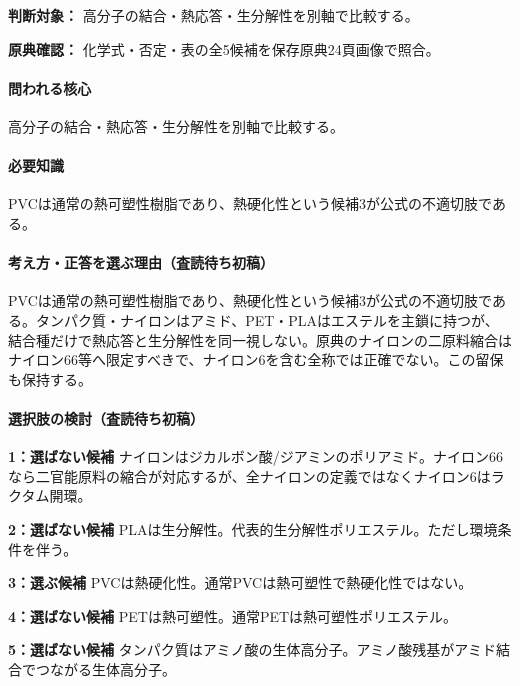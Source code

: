 \noindent\textbf{判断対象：} 高分子の結合・熱応答・生分解性を別軸で比較する。\par

\noindent\textbf{原典確認：} 化学式・否定・表の全5候補を保存原典24頁画像で照合。\par

\paragraph{問われる核心} 高分子の結合・熱応答・生分解性を別軸で比較する。

\paragraph{必要知識} PVCは通常の熱可塑性樹脂であり、熱硬化性という候補3が公式の不適切肢である。

\paragraph{考え方・正答を選ぶ理由（査読待ち初稿）} PVCは通常の熱可塑性樹脂であり、熱硬化性という候補3が公式の不適切肢である。タンパク質・ナイロンはアミド、PET・PLAはエステルを主鎖に持つが、結合種だけで熱応答と生分解性を同一視しない。原典のナイロンの二原料縮合はナイロン66等へ限定すべきで、ナイロン6を含む全称では正確でない。この留保も保持する。

\paragraph{選択肢の検討（査読待ち初稿）}\mbox{}\par

\noindent\textbf{1：選ばない候補} ナイロンはジカルボン酸/ジアミンのポリアミド。ナイロン66なら二官能原料の縮合が対応するが、全ナイロンの定義ではなくナイロン6はラクタム開環。\par

\noindent\textbf{2：選ばない候補} PLAは生分解性。代表的生分解性ポリエステル。ただし環境条件を伴う。\par

\noindent\textbf{3：選ぶ候補} PVCは熱硬化性。通常PVCは熱可塑性で熱硬化性ではない。\par

\noindent\textbf{4：選ばない候補} PETは熱可塑性。通常PETは熱可塑性ポリエステル。\par

\noindent\textbf{5：選ばない候補} タンパク質はアミノ酸の生体高分子。アミノ酸残基がアミド結合でつながる生体高分子。\par

